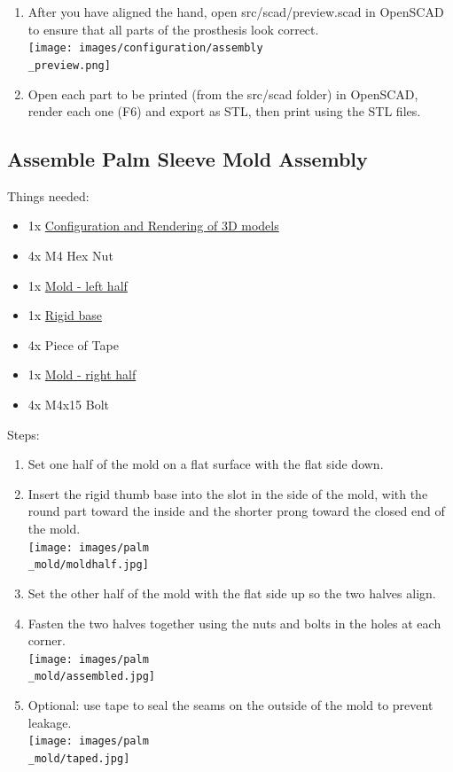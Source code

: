 \documentclass[11pt]{article}
\begin{document}
\begin{enumerate}
\item After you have aligned the hand, open src/scad/preview.scad in OpenSCAD to ensure that all parts of the prosthesis look correct.\\ \texttt{[image: images/configuration/assembly\\\_preview.png]}
\item Open each part to be printed (from the src/scad folder) in OpenSCAD, render each one (F6) and export as STL, then print using the STL files.
\end{enumerate}

\subsection{Assemble Palm Sleeve Mold Assembly}
Things needed:
\begin{itemize}
\item 1x \hyperlink{thing_config\_file}{Configuration and Rendering of 3D models}
\item 4x M4 Hex Nut
\item 1x \hyperlink{thing_mold\_left\_half}{Mold - left half}
\item 1x \hyperlink{thing_rigid\_base}{Rigid base}
\item 4x Piece of Tape
\item 1x \hyperlink{thing_mold\_right\_half}{Mold - right half}
\item 4x M4x15 Bolt
\end{itemize}
Steps:
\begin{enumerate}
\item Set one half of the mold on a flat surface with the flat side down.
\item Insert the rigid thumb base into the slot in the side of the mold, with the round part toward the inside and the shorter prong toward the closed end of the mold.\\ \texttt{[image: images/palm\\\_mold/moldhalf.jpg]}
\item Set the other half of the mold with the flat side up so the two halves align.
\item Fasten the two halves together using the nuts and bolts in the holes at each corner.\\ \texttt{[image: images/palm\\\_mold/assembled.jpg]}
\item Optional: use tape to seal the seams on the outside of the mold to prevent leakage.\\ \texttt{[image: images/palm\\\_mold/taped.jpg]}
\end{enumerate}
\end{document}
